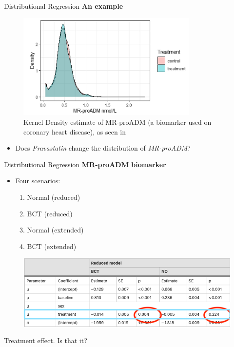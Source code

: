 \documentclass[t]{beamer} 	%
\begin{document}
\begin{frame}{Distributional Regression}
	\textbf{An example} \\
	\begin{figure}
		\includegraphics[width=0.8\textwidth]{images/mr_proadm_dist.png}
		\caption{Kernel Density estimate of MR-proADM (a biomarker used on coronary heart disease), as seen in \citet{heller2022}}
	\end{figure}
	\begin{itemize}
		\item Does \textit{Pravastatin} change the distribution of \textit{MR-proADM}?
	\end{itemize}
\end{frame}

\begin{frame}{Distributional Regression}
	\textbf{MR-proADM biomarker} \\
	\begin{itemize}
		\item Four scenarios:
		\begin{enumerate}
			\item Normal (reduced)
			\item BCT (reduced)
			\item Normal (extended)
			\item BCT (extended)
		\end{enumerate}
	\end{itemize}
	\pause
	\begin{figure}
		\centering
		\includegraphics[width=\textwidth]{images/gillian_table1.png}
	\end{figure}
	Treatment effect. Is that it?
\end{frame}
\end{document}
